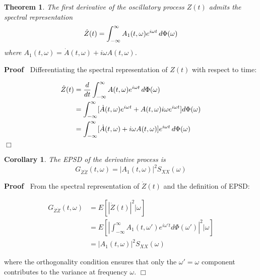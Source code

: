 \documentclass{article}
\newenvironment{proof}{\noindent\textbf{Proof\ }}{\hspace*{\fill}$\Box$\medskip}
\newtheorem{corollary}{Corollary}
\newtheorem{theorem}{Theorem}
\begin{document}
\begin{theorem}
  The first derivative of the oscillatory process $Z (t)$ admits the spectral
  representation
  \begin{equation}
    \dot{Z} (t) = \int_{- \infty}^{\infty} A_1 (t, \omega) e^{i \omega t} 
    \hspace{0.17em} d \Phi (\omega)
  \end{equation}
  where $A_1 (t, \omega) = \dot{A} (t, \omega) + i \omega A (t, \omega)$.
\end{theorem}

\begin{proof}
  Differentiating the spectral representation of $Z (t)$ with respect to time:
  
  \begin{align}
    \dot{Z} (t) & = \frac{d}{dt}  \int_{- \infty}^{\infty} A (t, \omega) e^{i
    \omega t}  \hspace{0.17em} d \Phi (\omega) \\
    & = \int_{- \infty}^{\infty} [\dot{A} (t, \omega) e^{i \omega t} + A (t,
    \omega) i \omega e^{i \omega t}] d \Phi (\omega) \\
    & = \int_{- \infty}^{\infty} [\dot{A} (t, \omega) + i \omega A (t,
    \omega)] e^{i \omega t}  \hspace{0.17em} d \Phi (\omega) 
  \end{align}
\end{proof}

\begin{corollary}
  The EPSD of the derivative process is
  \begin{equation}
    G_{\dot{Z}  \dot{Z}} (t, \omega) = |A_1 (t, \omega) |^2 S_{XX} (\omega)
  \end{equation}
\end{corollary}

\begin{proof}
  From the spectral representation of $\dot{Z} (t)$ and the definition of
  EPSD:
  
  \begin{align}
    G_{\dot{Z}  \dot{Z}} (t, \omega) & = E [| \dot{Z} (t) |^2 | \omega] \\
    & = E \left[ \left| \int_{- \infty}^{\infty} A_1 (t, \omega') e^{i
    \omega' t} d \Phi (\omega') \right|^2 | \omega \right] \\
    & = |A_1 (t, \omega) |^2 S_{XX} (\omega) 
  \end{align}
  
  where the orthogonality condition ensures that only the $\omega' = \omega$
  component contributes to the variance at frequency $\omega$.
\end{proof}
\end{document}

